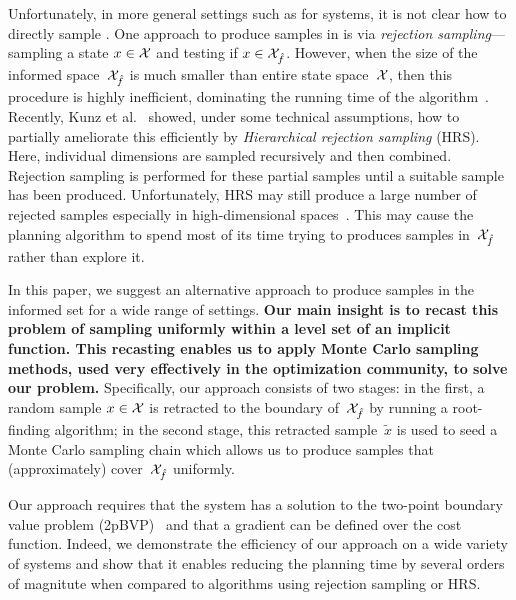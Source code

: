 \documentclass[letterpaper, 10 pt, conference]{ieeeconf}  %
\begin{document}
Unfortunately, in more general settings such as
for systems,
it is not clear how to directly sample \Cinf.
%
One approach to produce samples in \Cinf is via \emph{rejection sampling}---sampling a state $x \in \mathcal{X}$ and testing if $x \in \mathcal{X}_{\hat{f}}$.
However, when the size of the informed space~$\mathcal{X}_{\hat{f}}$ is much smaller than entire state space~$\mathcal{X}$, then this procedure is highly inefficient, dominating the running time of the algorithm~\cite{KTC16}.
Recently, Kunz et al.~\cite{KTC16} showed, under some technical assumptions, how to partially ameliorate this efficiently by \emph{Hierarchical rejection sampling} (HRS). 
Here, individual dimensions are sampled recursively 
and then combined. Rejection sampling is performed for these partial samples until a suitable sample has been produced. 
Unfortunately, HRS may still produce a large number of rejected samples especially in high-dimensional spaces~\cite{KTC16}.
This may cause the planning algorithm to spend most of its time trying to produces samples in~$\mathcal{X}_{\hat{f}}$ rather than explore it.

In this paper, we suggest an alternative approach to produce samples in the informed set \Cinf for a wide range of settings.
\textbf{
Our main insight is to recast this problem of sampling uniformly within a level set of an implicit function.
This recasting enables us to apply Monte Carlo sampling methods, used very effectively in the optimization community, to solve our problem.
}
%
Specifically, our approach consists of two stages:
in the first, a random sample $x \in \mathcal{X}$ is retracted to the boundary of~$\mathcal{X}_{\hat{f}}$ by running a root-finding algorithm;
in the second stage, this retracted sample~$\tilde{x}$ is used to seed a Monte Carlo sampling chain which allows us to  produce samples that (approximately) cover~$\mathcal{X}_{\hat{f}}$  uniformly.

Our approach requires that the system has a solution to the two-point boundary value problem (2pBVP)~\cite{L06, H02} and that a gradient can be defined over the cost function.
Indeed, we demonstrate the efficiency of our approach on a wide variety of systems and show that it enables reducing the planning time by several orders of magnitute when compared to algorithms using rejection sampling or HRS.
\end{document}
